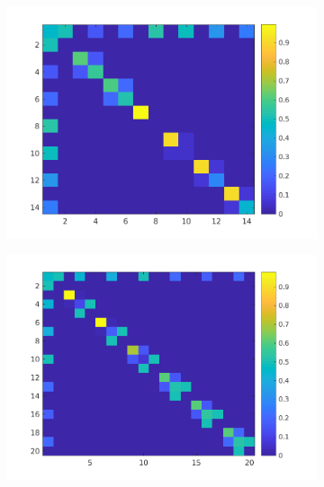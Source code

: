 \begin{figure}[H]
\begin{subfigure}{0.45\textwidth}
\centering
\includegraphics[width=\textwidth]{jbs_figures/adj_1}
\caption{}
\label{adj_1}
\end{subfigure}
\centering
\begin{subfigure}{0.45\textwidth}
\includegraphics[width=\textwidth]{jbs_figures/adj_2}
\caption{}
\label{adj_2}
\end{subfigure} \\
\begin{subfigure}{0.45\textwidth}
\centering

\end{subfigure}
\end{figure}
